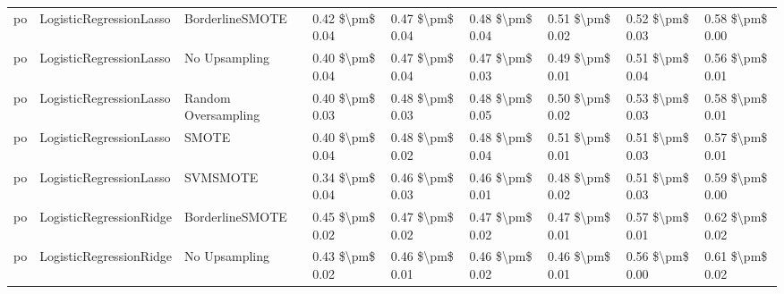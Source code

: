\begin{tabular}{lllllllll}
      po &         LogisticRegressionLasso &               BorderlineSMOTE &     0.42 \$\textbackslash pm\$ 0.04 &           0.47 \$\textbackslash pm\$ 0.04 &       0.48 \$\textbackslash pm\$ 0.04 &        0.51 \$\textbackslash pm\$ 0.02 &                         0.52 \$\textbackslash pm\$ 0.03 &     0.58 \$\textbackslash pm\$ 0.00 \\
      po &         LogisticRegressionLasso &                 No Upsampling &     0.40 \$\textbackslash pm\$ 0.04 &           0.47 \$\textbackslash pm\$ 0.04 &       0.47 \$\textbackslash pm\$ 0.03 &        0.49 \$\textbackslash pm\$ 0.01 &                         0.51 \$\textbackslash pm\$ 0.04 &     0.56 \$\textbackslash pm\$ 0.01 \\
      po &         LogisticRegressionLasso &           Random Oversampling &     0.40 \$\textbackslash pm\$ 0.03 &           0.48 \$\textbackslash pm\$ 0.03 &       0.48 \$\textbackslash pm\$ 0.05 &        0.50 \$\textbackslash pm\$ 0.02 &                         0.53 \$\textbackslash pm\$ 0.03 &     0.58 \$\textbackslash pm\$ 0.01 \\
      po &         LogisticRegressionLasso &                         SMOTE &     0.40 \$\textbackslash pm\$ 0.04 &           0.48 \$\textbackslash pm\$ 0.02 &       0.48 \$\textbackslash pm\$ 0.04 &        0.51 \$\textbackslash pm\$ 0.01 &                         0.51 \$\textbackslash pm\$ 0.03 &     0.57 \$\textbackslash pm\$ 0.01 \\
      po &         LogisticRegressionLasso &                      SVMSMOTE &     0.34 \$\textbackslash pm\$ 0.04 &           0.46 \$\textbackslash pm\$ 0.03 &       0.46 \$\textbackslash pm\$ 0.01 &        0.48 \$\textbackslash pm\$ 0.02 &                         0.51 \$\textbackslash pm\$ 0.03 &     0.59 \$\textbackslash pm\$ 0.00 \\
      po &         LogisticRegressionRidge &               BorderlineSMOTE &     0.45 \$\textbackslash pm\$ 0.02 &           0.47 \$\textbackslash pm\$ 0.02 &       0.47 \$\textbackslash pm\$ 0.02 &        0.47 \$\textbackslash pm\$ 0.01 &                         0.57 \$\textbackslash pm\$ 0.01 &     0.62 \$\textbackslash pm\$ 0.02 \\
      po &         LogisticRegressionRidge &                 No Upsampling &     0.43 \$\textbackslash pm\$ 0.02 &           0.46 \$\textbackslash pm\$ 0.01 &       0.46 \$\textbackslash pm\$ 0.02 &        0.46 \$\textbackslash pm\$ 0.01 &                         0.56 \$\textbackslash pm\$ 0.00 &     0.61 \$\textbackslash pm\$ 0.02 \\

\end{tabular}
